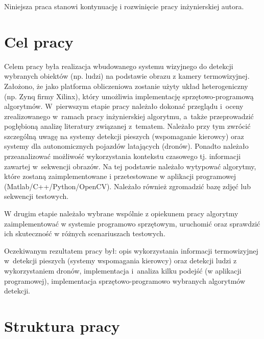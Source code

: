 Niniejsza praca stanowi kontynuację i rozwinięcie pracy inżynierskiej autora.

\section{Cel pracy}

Celem pracy była realizacja wbudowanego systemu wizyjnego do detekcji wybranych obiektów (np. ludzi) na podstawie obrazu z kamery termowizyjnej. 
Założono, że jako platforma obliczeniowa zostanie użyty układ heterogeniczny (np. Zynq firmy Xilinx), który umożliwia implementację sprzętowo-programową algorytmów.
W~pierwszym etapie pracy należało dokonać przeglądu i~oceny zrealizowanego w~ramach pracy inżynierskiej algorytmu, a~także przeprowadzić pogłębioną analizę literatury związanej z~tematem. 
Należało przy tym zwrócić szczególną uwagę na systemy detekcji pieszych (wspomaganie kierowcy) oraz systemy dla autonomicznych pojazdów latających (dronów). 
Ponadto należało przeanalizować możliwość wykorzystania kontekstu czasowego tj. informacji zawartej w~sekwencji obrazów. 
Na tej podstawie należało wytypować algorytmy, które zostaną zaimplementowane i przetestowane w aplikacji programowej (Matlab/C++/Python/OpenCV). 
Należało również zgromadzić bazę zdjęć lub sekwencji testowych.

W drugim etapie należało wybrane wspólnie z opiekunem pracy algorytmy zaimplementować w systemie programowo sprzętowym, uruchomić oraz sprawdzić ich skuteczność w różnych scenariuszach testowych.

Oczekiwanym rezultatem pracy był: opis wykorzystania informacji termowizyjnej w~detekcji pieszych (systemy wspomagania kierowcy) oraz detekcji ludzi z wykorzystaniem dronów, implementacja i~analiza kilku podejść (w aplikacji programowej), implementacja sprzętowo-programowo wybranych algorytmów detekcji.

\section{Struktura pracy}

